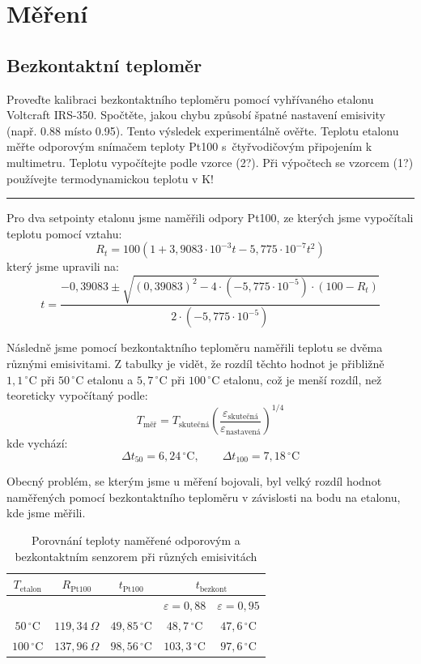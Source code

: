 \documentclass[a4paper,12pt]{article}
\newcommand{\unitC}{\,^\circ\mathrm{C}}
\begin{document}
\newpage 
\section{Měření}
\subsection{Bezkontaktní teploměr}

Proveďte kalibraci bezkontaktního teploměru pomocí vyhřívaného etalonu Voltcraft IRS-350.
Spočtěte, jakou chybu způsobí špatné nastavení emisivity (např. 0.88 místo 0.95). Tento výsledek
experimentálně ověřte. Teplotu etalonu měřte odporovým snímačem teploty Pt100 s~čtyřvodičovým
připojením k multimetru. Teplotu vypočítejte podle vzorce (2?). Při výpočtech se vzorcem (1?)
používejte termodynamickou teplotu v K!

\par\noindent\rule{\textwidth}{0.4pt}

Pro dva setpointy etalonu jsme naměřili odpory Pt100, ze kterých jsme vypočítali teplotu pomocí vztahu:
$$
R_t = 100 \left(1 + 3{,}9083 \cdot 10^{-3} t - 5{,}775 \cdot 10^{-7} t^2 \right)
$$
který jsme upravili na:
$$
t = \frac{-0{,}39083 \pm \sqrt{(0{,}39083)^2 - 4 \cdot (-5{,}775 \cdot 10^{-5}) \cdot (100 - R_t)}}{2 \cdot (-5{,}775 \cdot 10^{-5})}
$$

Následně jsme pomocí bezkontaktního teploměru naměřili teplotu se dvěma různými emisivitami. Z tabulky je vidět, že rozdíl těchto hodnot je přibližně $1{,}1\unitC$ při $50\unitC$ etalonu a $5{,}7\unitC$ při $100\unitC$ etalonu, což je menší rozdíl, než teoreticky vypočítaný podle:
$$
T_{\text{měř}} = T_{\text{skutečná}} \left(\frac{\varepsilon_{\text{skutečná}}}{\varepsilon_{\text{nastavená}}}\right)^{1/4}
$$
kde vychází:
$$
\Delta t_{50} = 6{,}24\unitC,
\qquad
\Delta t_{100} = 7{,}18\unitC
$$

Obecný problém, se kterým jsme u měření bojovali, byl velký rozdíl hodnot naměřených pomocí bezkontaktního teploměru v závislosti na bodu na etalonu, kde jsme měřili.

\begin{table}[H]
\centering
\begin{tabular}{|c|c|c|c|c|}
\hline
$T_{\text{etalon}}$ &
$R_{\text{Pt100}}$ &
$t_{\text{Pt100}}$ &
\multicolumn{2}{c|}{$t_{\text{bezkont}}$} \\
\hline
& & & $\varepsilon = 0{,}88$ & $\varepsilon = 0{,}95$ \\
\hline
$50\unitC$  & $119{,}34\ \Omega$ & $49{,}85\unitC$ & $48{,}7\unitC$ & $47{,}6\unitC$ \\
\hline
$100\unitC$ & $137{,}96\ \Omega$ & $98{,}56\unitC$ & $103{,}3\unitC$ & $97{,}6\unitC$ \\
\hline
\end{tabular}
\caption{Porovnání teploty naměřené odporovým a bezkontaktním senzorem při různých emisivitách}
\end{table}
\end{document}

